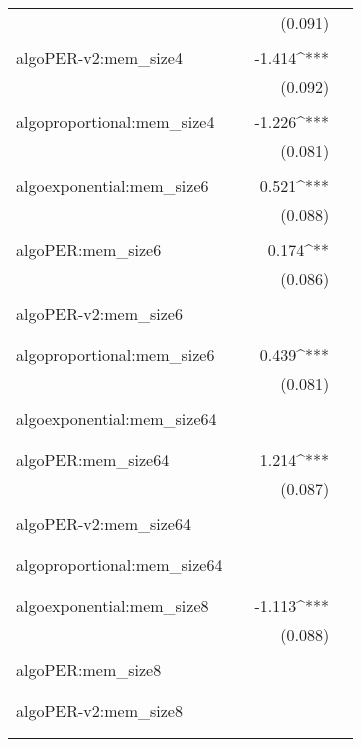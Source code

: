 \begin{table}[!htbp]
\begin{tabular}{@{\extracolsep{5pt}}lD{.}{.}{-3} D{.}{.}{-3} D{.}{.}{-3} }
  &  & (0.091) &  \\ 
  & & & \\ 
 algoPER-v2:mem\_size4 &  & -1.414^{***} &  \\ 
  &  & (0.092) &  \\ 
  & & & \\ 
 algoproportional:mem\_size4 &  & -1.226^{***} &  \\ 
  &  & (0.081) &  \\ 
  & & & \\ 
 algoexponential:mem\_size6 &  & 0.521^{***} &  \\ 
  &  & (0.088) &  \\ 
  & & & \\ 
 algoPER:mem\_size6 &  & 0.174^{**} &  \\ 
  &  & (0.086) &  \\ 
  & & & \\ 
 algoPER-v2:mem\_size6 &  &  &  \\ 
  &  &  &  \\ 
  & & & \\ 
 algoproportional:mem\_size6 &  & 0.439^{***} &  \\ 
  &  & (0.081) &  \\ 
  & & & \\ 
 algoexponential:mem\_size64 &  &  &  \\ 
  &  &  &  \\ 
  & & & \\ 
 algoPER:mem\_size64 &  & 1.214^{***} &  \\ 
  &  & (0.087) &  \\ 
  & & & \\ 
 algoPER-v2:mem\_size64 &  &  &  \\ 
  &  &  &  \\ 
  & & & \\ 
 algoproportional:mem\_size64 &  &  &  \\ 
  &  &  &  \\ 
  & & & \\ 
 algoexponential:mem\_size8 &  & -1.113^{***} &  \\ 
  &  & (0.088) &  \\ 
  & & & \\ 
 algoPER:mem\_size8 &  &  &  \\ 
  &  &  &  \\ 
  & & & \\ 
 algoPER-v2:mem\_size8 &  &  &  \\ 
  &  &  &  \\ 
  & & & \\ 

\end{tabular}
\end{table}

